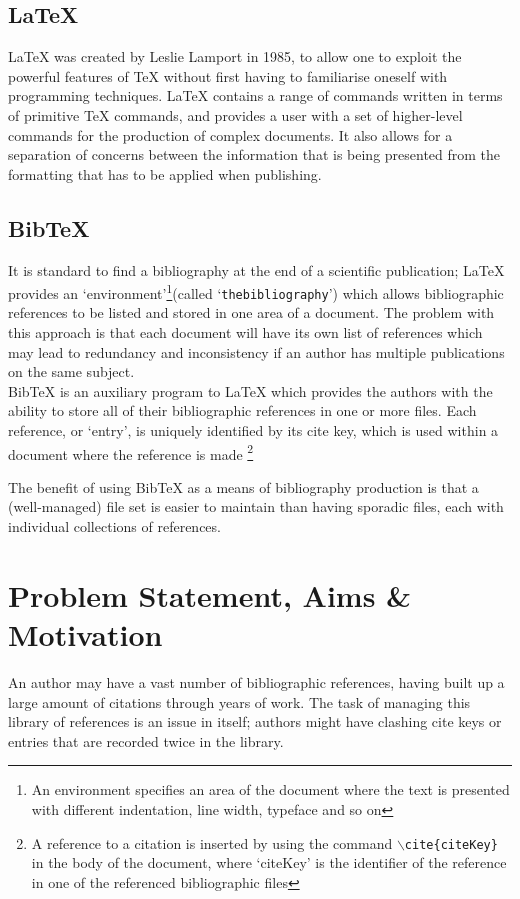 \documentclass{l4proj}
\newcommand{\BibTeX}{B{\sc ib}\TeX}
\newcommand{\bibtex}{\BibTeX}
\newcommand{\latex}{\LaTeX{} }
\begin{document}
\subsection{\LaTeX}
\latex was created by Leslie Lamport in 1985, to allow one to exploit the powerful features of \TeX{} without first having to familiarise oneself with programming techniques. \latex contains a range of commands written in terms of primitive \TeX{} commands, and provides a user with a set of higher-level commands for the production of complex documents.  It also allows for a separation of concerns between the information that is being presented from the formatting that has to be applied when publishing\cite{KD95}.

\subsection{\bibtex}
It is standard to find a bibliography at the end of a scientific publication; \latex provides an `environment'\footnote{An environment specifies an area of the document where the text is presented with different indentation, line width, typeface and so on\cite{KD95}}(called `\texttt{thebibliography}') which allows bibliographic references to be listed and stored in one area of a document\cite{KD95}.  The problem with this approach is that each document will have its own list of references which may lead to redundancy and inconsistency if an author has multiple publications on the same subject. \\
\bibtex{} is an auxiliary program to \latex which provides the authors with the ability to store all of their bibliographic references in one or more files.  Each reference, or `entry', is uniquely identified by its cite key, which is used within a document where the reference is made \footnote{A reference to a citation is inserted by using the command \texttt{$\backslash$cite\{citeKey\}} in the body of the document, where `citeKey' is the identifier of the reference in one of the referenced bibliographic files}

The benefit of using \bibtex{} as a means of bibliography production is that a (well-managed) file set is easier to maintain than having sporadic files, each with individual collections of references.

\section{Problem Statement, Aims \& Motivation}
An author may have a vast number of bibliographic references, having built up a large amount of citations through years of work.  The task of managing this library of references is an issue in itself; authors might have clashing cite keys or entries that are recorded twice in the library. \\
\end{document}
